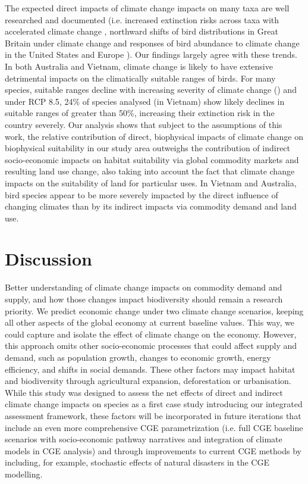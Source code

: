 The expected direct impacts of climate change impacts on many taxa are well researched and documented (i.e. increased extinction risks across taxa with accelerated climate change \citep{urban_accelerating_2015}, northward shifts of bird distributions in Great Britain under climate change \citep{gillings_directionality_2015} and responses of bird abundance to climate change in the United States and Europe \citep{stephens_consistent_2016}). Our findings largely agree with these trends. In both Australia and Vietnam, climate change is likely to have extensive detrimental impacts on the climatically suitable ranges of birds. For many species, suitable ranges decline with increasing severity of climate change () and under RCP 8.5, 24\% of species analysed (in Vietnam) show likely declines in suitable ranges of greater than 50\%, increasing their extinction risk in the country severely. Our analysis shows that subject to the assumptions of this work, the relative contribution of direct, biophysical impacts of climate change on biophysical suitability in our study area outweighs the contribution of indirect socio-economic impacts on habitat suitability via global commodity markets and resulting land use change, also taking into account the fact that climate change impacts on the suitability of land for particular uses. In Vietnam and Australia, bird species appear to be more severely impacted by the direct influence of changing climates than by its indirect impacts via commodity demand and land use.

\section{Discussion}

Better understanding of climate change impacts on commodity demand and supply, and how those changes impact biodiversity should remain a research priority.
We predict economic change under two climate change scenarios, keeping all other aspects of the global economy at current baseline values. This way, we could capture and isolate the effect of climate change on the economy. However, this approach omits other socio-economic processes that could affect supply and demand, such as population growth, changes to economic growth, energy efficiency, and shifts in social demands. These other factors may impact habitat and biodiversity through agricultural expansion, deforestation or urbanisation. While this study was designed to assess the net effects of direct and indirect climate change impacts on species as a first case study introducing our integrated assessment framework, these factors will be incorporated in future iterations that include an even more comprehensive CGE parametrization (i.e. full CGE baseline scenarios with socio-economic pathway narratives \citep{van_vuuren_climate_2014} and integration of climate models in CGE analysis) and through improvements to current CGE methods by including, for example, stochastic effects of natural disasters in the CGE modelling.


